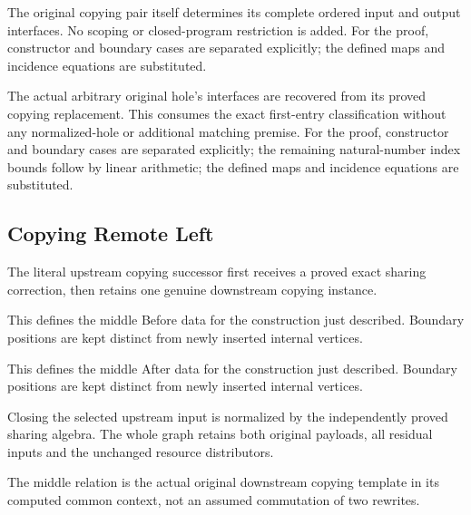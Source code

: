 The original copying pair itself determines its complete ordered input and output interfaces. No scoping or closed-program restriction is added.
For the proof, constructor and boundary cases are separated explicitly; the defined maps and incidence equations are substituted.
\par{}

The actual arbitrary original hole's interfaces are recovered from its proved copying replacement. This consumes the exact first-entry classification without any normalized-hole or additional matching premise.
For the proof, constructor and boundary cases are separated explicitly; the remaining natural-number index bounds follow by linear arithmetic; the defined maps and incidence equations are substituted.
\par{}

\subsection{Copying Remote Left}
The literal upstream copying successor first receives a proved exact sharing correction, then retains one genuine downstream copying instance.

This defines the middle Before data for the construction just described. Boundary positions are kept distinct from newly inserted internal vertices.
\par{}

This defines the middle After data for the construction just described. Boundary positions are kept distinct from newly inserted internal vertices.
\par{}

Closing the selected upstream input is normalized by the independently proved sharing algebra. The whole graph retains both original payloads, all residual inputs and the unchanged resource distributors.
\par{}

The middle relation is the actual original downstream copying template in its computed common context, not an assumed commutation of two rewrites.
\par{}

